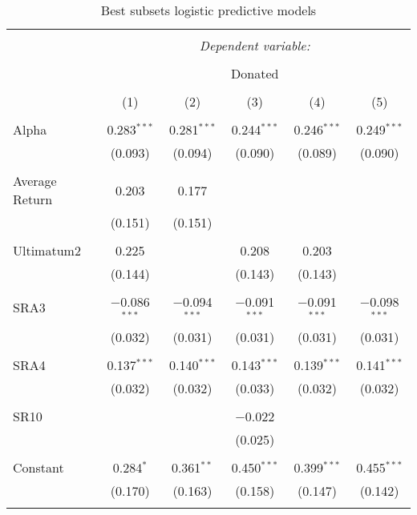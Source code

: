 \begin{table}[H] \centering 
  \caption{Best subsets logistic predictive models} 
  \label{} 
  \begin{adjustbox}{width=\textwidth}
\begin{tabular}{@{\extracolsep{5pt}}lccccc} 
\\[-1.8ex]\hline 
\hline \\[-1.8ex] 
 & \multicolumn{5}{c}{\textit{Dependent variable:}} \\ 
\cline{2-6} 
\\[-1.8ex] & \multicolumn{5}{c}{Donated} \\ 
\\[-1.8ex] & (1) & (2) & (3) & (4) & (5)\\ 
\hline \\[-1.8ex] 
 Alpha & 0.283$^{***}$ & 0.281$^{***}$ & 0.244$^{***}$ & 0.246$^{***}$ & 0.249$^{***}$ \\ 
  & (0.093) & (0.094) & (0.090) & (0.089) & (0.090) \\ 
  & & & & & \\ 
 Average Return & 0.203 & 0.177 &  &  &  \\ 
  & (0.151) & (0.151) &  &  &  \\ 
  & & & & & \\ 
 Ultimatum2 & 0.225 &  & 0.208 & 0.203 &  \\ 
  & (0.144) &  & (0.143) & (0.143) &  \\ 
  & & & & & \\ 
 SRA3 & $-$0.086$^{***}$ & $-$0.094$^{***}$ & $-$0.091$^{***}$ & $-$0.091$^{***}$ & $-$0.098$^{***}$ \\ 
  & (0.032) & (0.031) & (0.031) & (0.031) & (0.031) \\ 
  & & & & & \\ 
 SRA4 & 0.137$^{***}$ & 0.140$^{***}$ & 0.143$^{***}$ & 0.139$^{***}$ & 0.141$^{***}$ \\ 
  & (0.032) & (0.032) & (0.033) & (0.032) & (0.032) \\ 
  & & & & & \\ 
 SR10 &  &  & $-$0.022 &  &  \\ 
  &  &  & (0.025) &  &  \\ 
  & & & & & \\ 
 Constant & 0.284$^{*}$ & 0.361$^{**}$ & 0.450$^{***}$ & 0.399$^{***}$ & 0.455$^{***}$ \\ 
  & (0.170) & (0.163) & (0.158) & (0.147) & (0.142) \\ 
  & & & & & \\ 

\end{tabular}
\end{adjustbox}
\end{table}

